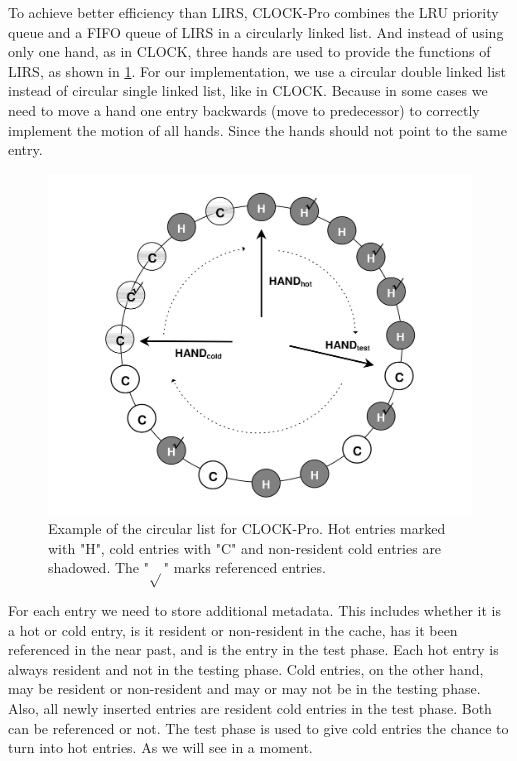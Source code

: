\documentclass[
	12pt,
	a4paper,
	abstract,
	bibliography=totoc,
	chapterprefix,
	headings=openright,
	numbers=endperiod,
	parskip=half,
	twoside,
]{scrreprt}
\begin{document}
To achieve better efficiency than LIRS, CLOCK-Pro combines the LRU priority queue and a FIFO queue of LIRS in a circularly linked list.
And instead of using only one hand, as in CLOCK, three hands are used to provide the functions of LIRS, 
as shown in \cref{fig:clock in clock-pro}.
For our implementation, we use a circular double linked list instead of circular single linked list, like in CLOCK.
Because in some cases we need to move a hand one entry backwards (move to predecessor) to correctly implement the motion of all hands.
Since the hands should not point to the same entry.

\begin{figure}[ht]
	\centering
	\includegraphics[scale=0.2]{clock_pro.png}
	\caption{Example of the circular list for CLOCK-Pro. Hot entries marked with "H", cold entries with "C" and non-resident cold entries are shadowed.
	The "$\sqrt{}$" marks referenced entries.}
		\label{fig:clock in clock-pro}
\end{figure}

For each entry we need to store additional metadata. This includes whether it is a hot or cold entry, 
is it resident or non-resident in the cache, has it been referenced in the near past, and is the entry in the test phase.
Each hot entry is always resident and not in the testing phase.
Cold entries, on the other hand, may be resident or non-resident and may or may not be in the testing phase.
Also, all newly inserted entries are resident cold entries in the test phase.
Both can be referenced or not.
The test phase is used to give cold entries the chance to turn into hot entries.
As we will see in a moment.
\end{document}
